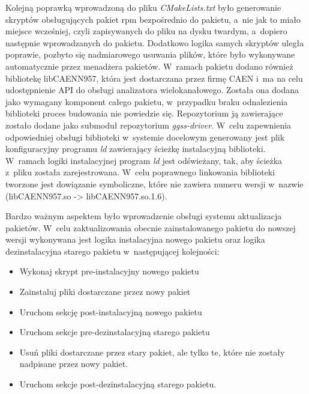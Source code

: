 Kolejną poprawką wprowadzoną do pliku \textit{CMakeLists.txt} było generowanie skryptów obsługujących pakiet \gls*{rpm} bezpośrednio do pakietu, a~nie jak to miało miejsce wcześniej, czyli zapisywanych do pliku na dysku twardym, a~dopiero następnie wprowadzanych do pakietu. Dodatkowo logika samych skryptów uległa poprawie, pozbyto się nadmiarowego usuwania plików, które było wykonywane automatycznie przez menadżera pakietów. W~ramach pakietu dodano również bibliotekę libCAENN957, która jest dostarczana przez firmę CAEN i~ma na celu udostępnienie API do obsługi analizatora wielokanałowego. Została ona dodana jako wymagany komponent całego pakietu, w~przypadku braku odnalezienia biblioteki proces budowania nie powiedzie się. Repozytorium ją zawierające zostało dodane jako submoduł repozytorium \textit{ggss-driver}. W~celu zapewnienia odpowiedniej obsługi biblioteki w~systemie docelowym generowany jest plik konfiguracyjny programu \textit{ld} zawierający ścieżkę instalacyjną biblioteki. W~ramach logiki instalacyjnej program \textit{ld} jest odświeżany, tak, aby ścieżka z~pliku została zarejestrowana. W~celu poprawnego linkowania biblioteki tworzone jest dowiązanie symboliczne, które nie zawiera numeru wersji w~nazwie (libCAENN957.so -> libCAENN957.so.1.6).

Bardzo ważnym aspektem było wprowadzenie obsługi systemu aktualizacja pakietów. W~celu zaktualizowania obecnie zainstalowanego pakietu do nowszej wersji wykonywana jest logika instalacyjna nowego pakietu oraz logika dezinstalacyjna starego pakietu w~następującej kolejności:
\begin{itemize}
\item Wykonaj skrypt pre-instalacyjny nowego pakietu
\item Zainstaluj pliki dostarczane przez nowy pakiet
\item Uruchom sekcję post-instalacyjną nowego pakietu
\item Uruchom sekcje pre-dezinstalacyjną starego pakietu
\item Usuń pliki dostarczane przez stary pakiet, ale tylko te, które nie zostały nadpisane przez nowy pakiet.
\item Uruchom sekcje post-dezinstalacyjną starego pakietu. \cite{RPMUpgrade}
\end{itemize}



